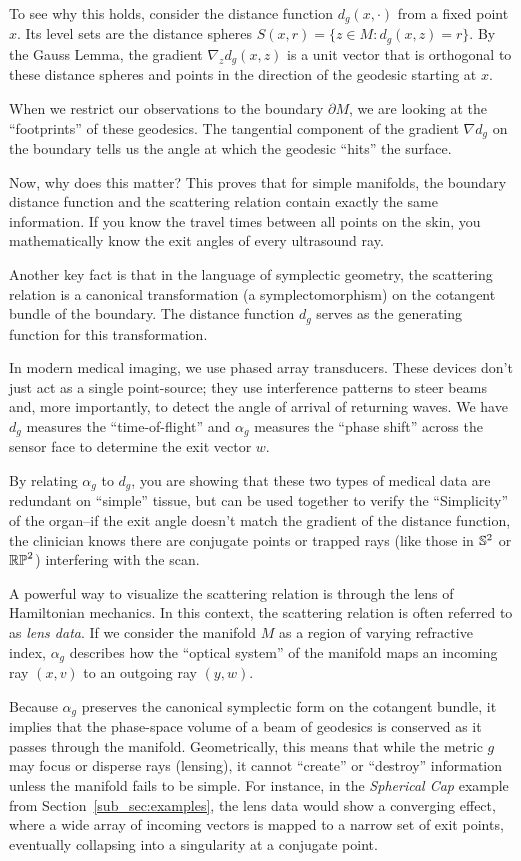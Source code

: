 To see why this holds, consider the distance function $d_g(x, \cdot)$ from a fixed point $x$. Its level sets are the distance spheres $S(x, r) = \{z \in M : d_g(x, z) = r\}$. By the Gauss Lemma, the gradient $\nabla_z d_g(x, z)$ is a unit vector that is orthogonal to these distance spheres and points in the direction of the geodesic starting at $x$.

When we restrict our observations to the boundary $\partial M$, we are looking at the ``footprints'' of these geodesics. The tangential component of the gradient $\nabla d_g$ on the boundary tells us the angle at which the geodesic ``hits'' the surface.

Now, why does this matter? This proves that for simple manifolds, the boundary distance function and the scattering relation contain exactly the same information. If you know the travel times between all points on the skin, you mathematically know the exit angles of every ultrasound ray.

Another key fact is that in the language of symplectic geometry, the scattering relation is a canonical transformation (a symplectomorphism) on the cotangent bundle of the boundary. The distance function $d_g$ serves as the generating function for this transformation.

In modern medical imaging, we use phased array transducers. These devices don't just act as a single point-source; they use interference patterns to steer beams and, more importantly, to detect the angle of arrival of returning waves. We have $d_g$ measures the ``time-of-flight'' and $\alpha_g$ measures the ``phase shift'' across the sensor face to determine the exit vector $w$.

By relating $\alpha_g$ to $d_g$, you are showing that these two types of medical data are redundant on ``simple'' tissue, but can be used together to verify the ``Simplicity'' of the organ--if the exit angle doesn't match the gradient of the distance function, the clinician knows there are conjugate points or trapped rays (like those in $\S^2$ or $\RP^2$) interfering with the scan.

A powerful way to visualize the scattering relation is through the lens of Hamiltonian mechanics. In this context, the scattering relation is often referred to as \emph{lens data}. If we consider the manifold $M$ as a region of varying refractive index, $\alpha_g$ describes how the ``optical system'' of the manifold maps an incoming ray $(x, v)$ to an outgoing ray $(y, w)$. 

Because $\alpha_g$ preserves the canonical symplectic form on the cotangent bundle, it implies that the phase-space volume of a beam of geodesics is conserved as it passes through the manifold. Geometrically, this means that while the metric $g$ may focus or disperse rays (lensing), it cannot ``create'' or ``destroy'' information unless the manifold fails to be simple. For instance, in the \emph{Spherical Cap} example from Section~\ref{sub_sec:examples}, the lens data would show a converging effect, where a wide array of incoming vectors is mapped to a narrow set of exit points, eventually collapsing into a singularity at a conjugate point.

